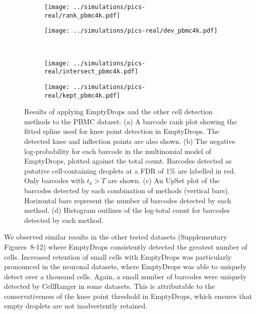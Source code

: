 \documentclass[10pt,letterpaper]{article}
\newcommand{\suppfigrealresults}{8-12}
\begin{document}
\begin{figure}[btp]
    \begin{center}
    \begin{subfigure}{0.49\textwidth}
        \texttt{[image: ../simulations/pics-real/rank\_pbmc4k.pdf]}
        \caption{}
    \end{subfigure}
    \begin{subfigure}{0.49\textwidth}
        \texttt{[image: ../simulations/pics-real/dev\_pbmc4k.pdf]}
        \caption{}
    \end{subfigure}\\[0.1in]
    \begin{subfigure}[b]{0.49\textwidth}
        \texttt{[image: ../simulations/pics-real/intersect\_pbmc4k.pdf]}
        \caption{}
    \end{subfigure}
    \begin{subfigure}[b]{0.49\textwidth}
        \texttt{[image: ../simulations/pics-real/kept\_pbmc4k.pdf]}
        \caption{}
    \end{subfigure}
\end{center}
    \caption{Results of applying EmptyDrops and the other cell detection methods to the PBMC dataset.
        (a) A barcode rank plot showing the fitted spline used for knee point detection in EmptyDrops. 
        The detected knee and inflection points are also shown.
        (b) The negative log-probability for each barcode in the multinomial model of EmptyDrops, plotted against the total count.
        Barcodes detected as putative cell-containing droplets at a FDR of 1\% are labelled in red.
        Only barcodes with $t_b > T$ are shown.
        (c) An UpSet plot \cite{lex2014upset} of the barcodes detected by each combination of methods (vertical bars).
        Horizontal bars represent the number of barcodes detected by each method.
        (d) Histogram outlines of the log-total count for barcodes detected by each method.
    }
\label{fig:realpbmc}
\end{figure}

We observed similar results in the other tested datasets (Supplementary Figures~\suppfigrealresults{}) where EmptyDrops consistently detected the greatest number of cells.
Increased retention of small cells with EmptyDrops was particularly pronounced in the neuronal datasets, where EmptyDrops was able to uniquely detect over a thousand cells.
Again, a small number of barcodes were uniquely detected by CellRanger in some datasets.
This is attributable to the conservativeness of the knee point threshold in EmptyDrops, which ensures that empty droplets are not inadvertently retained.
\end{document}
